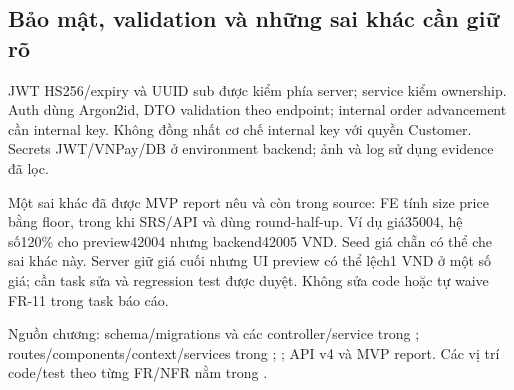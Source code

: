 \subsection{Bảo mật, validation và những sai khác cần giữ rõ}
JWT HS256/expiry và UUID sub được kiểm phía server; service kiểm ownership.
Auth dùng Argon2id, DTO validation theo endpoint; internal order advancement
cần internal key. Không đồng nhất cơ chế internal key với quyền Customer.
Secrets JWT/VNPay/DB ở environment backend; ảnh và log sử dụng evidence đã lọc.


Một sai khác đã được MVP report nêu và còn trong source: FE
 tính size price bằng floor, trong khi
SRS/API và  dùng round-half-up.
Ví dụ giá35004, hệ số120\% cho preview42004 nhưng backend42005 VND.
Seed giá chẵn có thể che sai khác này. Server giữ giá cuối nhưng UI preview
có thể lệch1 VND ở một số giá; cần task sửa và regression test được duyệt.
Không sửa code hoặc tự waive FR-11 trong task báo cáo.

Nguồn chương: schema/migrations và các controller/service trong
; routes/components/context/services trong ;
; API v4 và MVP report. Các vị trí
code/test theo từng FR/NFR nằm trong .
